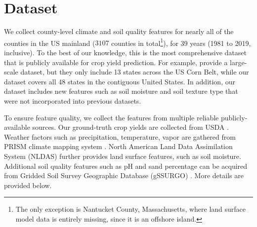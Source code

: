 \section{Dataset}



We collect county-level climate and soil quality features for nearly all of the counties in the US mainland ($3107$ counties in total\footnote{The only exception is Nantucket County, Massachusetts, where land surface model data is entirely missing, since it is an offshore island.}), for 39 years (1981 to 2019, inclusive). To the best of our knowledge, this is the most comprehensive dataset that is publicly available for crop yield prediction. For example, \cite{khaki2020cnn} provide a large-scale dataset, but they only include 13 states across the US Corn Belt, while our dataset covers all 48 states in the contiguous United States. In addition, our dataset includes new features such as soil moisture and soil texture type that were not incorporated into previous datasets.

To ensure feature quality, we collect the features from multiple reliable publicly-available sources. Our ground-truth crop yields are collected from USDA \cite{usda2013national}. Weather factors such as precipitation, temperature, vapor are gathered from PRISM climate mapping system \cite{daly2013prism}. North American Land Data Assimilation System (NLDAS) \cite{xia2012continental} further provides land surface features, such as soil moisture. Additional soil quality features such as pH and sand percentage can be acquired from Gridded Soil Survey Geographic Database (gSSURGO) \cite{soil2019gridded}. More details are provided below.

